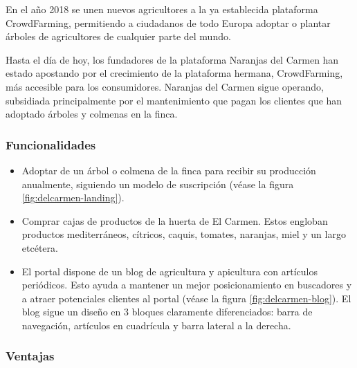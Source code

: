 En el año 2018 se unen nuevos agricultores a la ya establecida plataforma CrowdFarming, permitiendo a ciudadanos de todo Europa adoptar o plantar árboles de agricultores de cualquier parte del mundo.

Hasta el día de hoy, los fundadores de la plataforma Naranjas del Carmen han estado apostando por el crecimiento de la plataforma hermana, CrowdFarming, más accesible para los consumidores. Naranjas del Carmen sigue operando, subsidiada principalmente por el mantenimiento que pagan los clientes que han adoptado árboles y colmenas en la finca.

\subsubsection{Funcionalidades}

\begin{itemize}

	\item Adoptar de un árbol o colmena de la finca para recibir su producción anualmente, siguiendo un modelo de suscripción (véase la figura \ref{fig:delcarmen-landing}).

	\item Comprar cajas de productos de la huerta de El Carmen. Estos engloban productos mediterráneos, cítricos, caquis, tomates, naranjas, miel y un largo etcétera.

	\item El portal dispone de un blog de agricultura y apicultura con artículos periódicos. Esto ayuda a mantener un mejor posicionamiento en buscadores y a atraer potenciales clientes al portal (véase la figura \ref{fig:delcarmen-blog}). El blog sigue un diseño en 3 bloques claramente diferenciados: barra de navegación, artículos en cuadrícula y barra lateral a la derecha.

\end{itemize}


\subsubsection{Ventajas}

